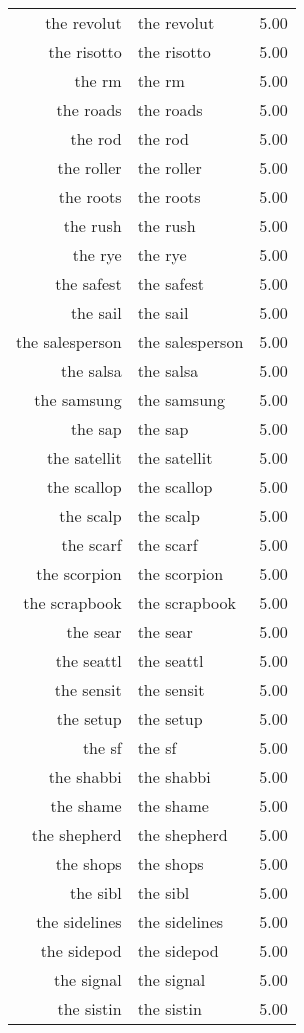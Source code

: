 \begin{table}[ht]
\begin{tabular}{rlr}
  the revolut & the revolut & 5.00 \\ 
  the risotto & the risotto & 5.00 \\ 
  the rm & the rm & 5.00 \\ 
  the roads & the roads & 5.00 \\ 
  the rod & the rod & 5.00 \\ 
  the roller & the roller & 5.00 \\ 
  the roots & the roots & 5.00 \\ 
  the rush & the rush & 5.00 \\ 
  the rye & the rye & 5.00 \\ 
  the safest & the safest & 5.00 \\ 
  the sail & the sail & 5.00 \\ 
  the salesperson & the salesperson & 5.00 \\ 
  the salsa & the salsa & 5.00 \\ 
  the samsung & the samsung & 5.00 \\ 
  the sap & the sap & 5.00 \\ 
  the satellit & the satellit & 5.00 \\ 
  the scallop & the scallop & 5.00 \\ 
  the scalp & the scalp & 5.00 \\ 
  the scarf & the scarf & 5.00 \\ 
  the scorpion & the scorpion & 5.00 \\ 
  the scrapbook & the scrapbook & 5.00 \\ 
  the sear & the sear & 5.00 \\ 
  the seattl & the seattl & 5.00 \\ 
  the sensit & the sensit & 5.00 \\ 
  the setup & the setup & 5.00 \\ 
  the sf & the sf & 5.00 \\ 
  the shabbi & the shabbi & 5.00 \\ 
  the shame & the shame & 5.00 \\ 
  the shepherd & the shepherd & 5.00 \\ 
  the shops & the shops & 5.00 \\ 
  the sibl & the sibl & 5.00 \\ 
  the sidelines & the sidelines & 5.00 \\ 
  the sidepod & the sidepod & 5.00 \\ 
  the signal & the signal & 5.00 \\ 
  the sistin & the sistin & 5.00 \\ 

\end{tabular}
\end{table}
